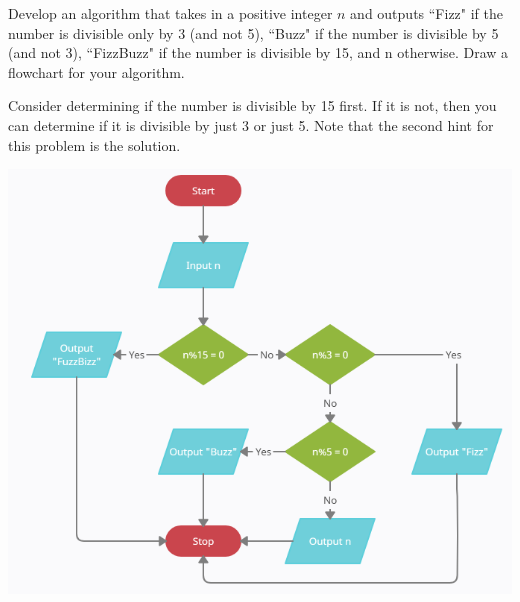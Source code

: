 \documentclass{ximera}
\begin{document}
\begin{question}
	Develop an algorithm that takes in a positive integer $n$ and outputs ``Fizz" if the number is divisible only by 3 (and not 5), ``Buzz" if the number is divisible by 5 (and not 3), ``FizzBuzz" if the number is divisible by 15, and n otherwise. Draw a flowchart for your algorithm.
	\begin{hint}
		Consider determining if the number is divisible by 15 first. If it is not, then you can determine if it is divisible by just 3 or just 5. Note that the second hint for this problem is the solution.
	\end{hint}
	\begin{hint}
		\begin{center}
		\includegraphics{fizzbuzz.png}
		\end{center}
	\end{hint}
\end{question}
\end{document}
